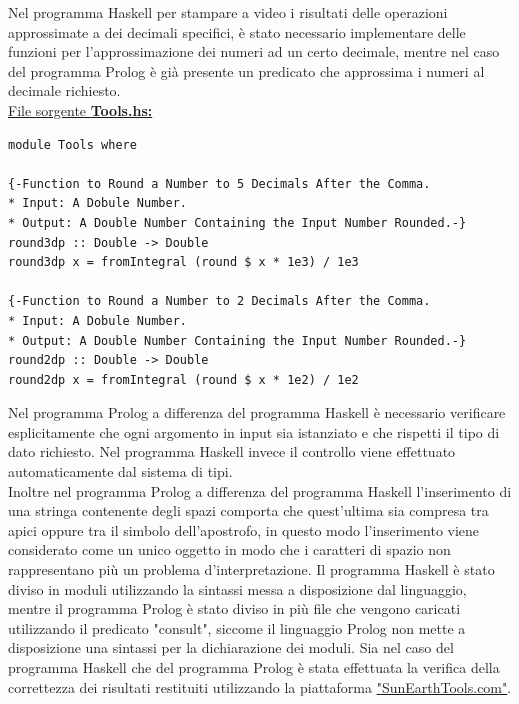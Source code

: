 \documentclass{article}
\begin{document}
Nel programma Haskell per stampare a video i risultati delle operazioni approssimate a dei decimali specifici, è stato necessario implementare delle funzioni per l'approssimazione dei numeri ad un certo decimale, mentre nel caso del programma Prolog è già presente un predicato che approssima i numeri al decimale richiesto.\\
\bigskip
\underline{File sorgente \textbf{Tools.hs:}}
\lstset{language=Haskell}
\begin{lstlisting}
module Tools where

{-Function to Round a Number to 5 Decimals After the Comma.
* Input: A Dobule Number.
* Output: A Double Number Containing the Input Number Rounded.-}
round3dp :: Double -> Double
round3dp x = fromIntegral (round $ x * 1e3) / 1e3

{-Function to Round a Number to 2 Decimals After the Comma.
* Input: A Dobule Number.
* Output: A Double Number Containing the Input Number Rounded.-}
round2dp :: Double -> Double
round2dp x = fromIntegral (round $ x * 1e2) / 1e2
\end{lstlisting}

Nel programma Prolog a differenza del programma Haskell è necessario verificare esplicitamente che ogni argomento in input sia istanziato e che rispetti il tipo di dato richiesto. Nel programma Haskell invece il controllo viene effettuato automaticamente dal sistema di tipi.\\
Inoltre nel programma Prolog a differenza del programma Haskell l'inserimento di una stringa contenente degli spazi comporta che quest'ultima sia compresa tra apici oppure tra il simbolo dell'apostrofo, in questo modo l'inserimento viene considerato come un unico oggetto in modo che i caratteri di spazio non rappresentano più un problema d'interpretazione.
Il programma Haskell è stato diviso in moduli utilizzando la sintassi messa a disposizione dal linguaggio, mentre il programma Prolog è stato diviso in più file che vengono caricati utilizzando il predicato "consult", siccome il linguaggio Prolog non mette a disposizione una sintassi per la dichiarazione dei moduli.
Sia nel caso del programma Haskell che del programma Prolog è stata effettuata la verifica della correttezza dei risultati restituiti utilizzando la piattaforma \href{https://www.sunearthtools.com/it/tools/distance.php}{"SunEarthTools.com"}.
\end{document}
